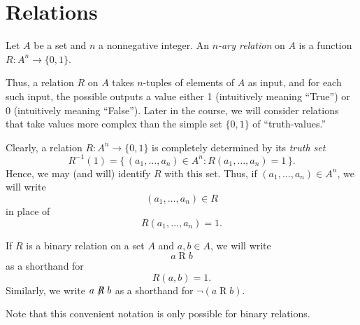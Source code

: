 \section{Relations}

\begin{definition}
  \label{def:relation}
  Let $A$ be a set and $n$ a nonnegative integer.
  An \emph{$n$-ary relation} on $A$ is a function $R\colon A^n\to\{0,1\}$.
\end{definition}

Thus, a relation $R$ on $A$ takes $n$-tuples of elements of $A$ as input,  and for each such input,  the possible outputs a value either 1 (intuitively meaning “True”) or $0$ (intuitively meaning “False”).
Later in the course, we will consider relations that take values more complex than the simple set $\{0,1\}$ of “truth-values.”

\begin{notation}
  \label{notn:relation}
  Clearly, a relation $R\colon A^n\to\{0,1\} $ is completely determined by its \emph{truth set}
  \[
    R^{-1}(1)=\{\, (a_1,\dots, a_n) \in A^n \colon R(a_1,\dots, a_n)=1 \,\}.
  \]
  Hence, we may (and will) identify $R$ with this set.
  Thus, if $(a_1,\dots, a_n)\in A^n$, we will write
  \[
    (a_1,\dots, a_n)\in R
  \]
  in place of
  \[
    R(a_1,\dots, a_n)=1.
  \]
\end{notation}

\begin{notation}
  If $R$ is a binary relation on a set $A$ and $a, b\in A$, we will write
  \[
    a\mathrel{R} b
  \]
  as a shorthand for
  \[
    R(a, b)=1.
  \]
  Similarly, we write $a\not\mathrel{R} b$ as a shorthand for $\neg(a \mathrel{R} b)$.

  Note that this convenient notation is only possible for binary relations.
\end{notation}

